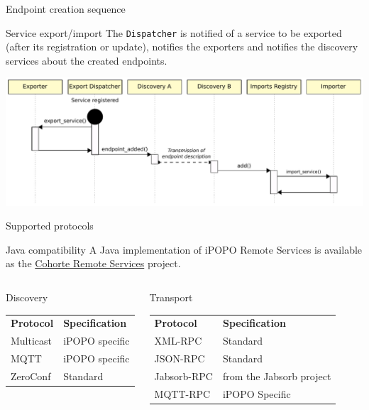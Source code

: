\begin{frame}{Endpoint creation sequence}
\begin{small}
\begin{block}{Service export/import}
The \texttt{Dispatcher} is notified of a service to be exported (after its registration or update), notifies the exporters and notifies the discovery services about the created endpoints.
\end{block}
\end{small}

\vspace{2ex}

\centering
\includegraphics[width=\textwidth]{../imgs/rs_sequence}
\end{frame}

\begin{frame}{Supported protocols}
\begin{exampleblock}{Java compatibility}
A Java implementation of iPOPO Remote Services is available as the \href{https://github.com/isandlaTech/cohorte-remote-services}{Cohorte Remote Services} project.
\end{exampleblock}

\begin{small}
\begin{columns}[t,onlytextwidth]
\begin{block}{Discovery}
\centering
\begin{tabular}{ll}
\textbf{Protocol} & \textbf{Specification}\\
Multicast & iPOPO specific\\
MQTT & iPOPO specific\\
ZeroConf & Standard\\
\end{tabular}
\end{block}

\begin{block}{Transport}
\centering
\begin{tabular}{ll}
\textbf{Protocol} & \textbf{Specification}\\
XML-RPC & Standard\\
JSON-RPC & Standard\\
Jabsorb-RPC & from the Jabsorb project\\
MQTT-RPC & iPOPO Specific\\
\end{tabular}
\end{block}
\end{columns}
\end{small}
\end{frame}
